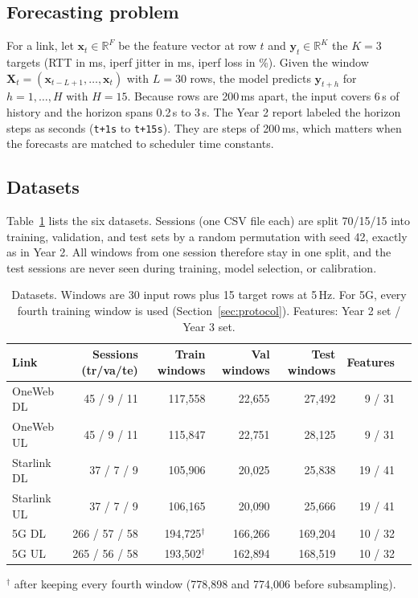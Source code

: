 \subsection{Forecasting problem}
For a link, let $\mathbf{x}_t\in\mathbb{R}^{F}$ be the feature vector at row $t$ and $\mathbf{y}_t\in\mathbb{R}^{K}$ the $K=3$ targets (RTT in ms, iperf jitter in ms, iperf loss in \%). Given the window $\mathbf{X}_t=(\mathbf{x}_{t-L+1},\dots,\mathbf{x}_t)$ with $L=30$ rows, the model predicts $\mathbf{y}_{t+h}$ for $h=1,\dots,H$ with $H=15$. Because rows are 200\,ms apart, the input covers 6\,s of history and the horizon spans 0.2\,s to 3\,s. The Year 2 report labeled the horizon steps as seconds (\texttt{t+1s} to \texttt{t+15s}). They are steps of 200\,ms, which matters when the forecasts are matched to scheduler time constants.

\subsection{Datasets}
Table~\ref{tab:data} lists the six datasets. Sessions (one CSV file each) are split 70/15/15 into training, validation, and test sets by a random permutation with seed 42, exactly as in Year 2. All windows from one session therefore stay in one split, and the test sessions are never seen during training, model selection, or calibration.

\begin{table}[t]
\centering
\caption{Datasets. Windows are 30 input rows plus 15 target rows at 5\,Hz. For 5G, every fourth training window is used (Section~\ref{sec:protocol}). Features: Year 2 set / Year 3 set.}
\label{tab:data}
\small
\begin{tabular}{lrrrrrr}
\toprule
Link & Sessions (tr/va/te) & Train windows & Val windows & Test windows & Features \\
\midrule
OneWeb DL   & 45 / 9 / 11   & 117{,}558 & 22{,}655  & 27{,}492  & 9 / 31 \\
OneWeb UL   & 45 / 9 / 11   & 115{,}847 & 22{,}751  & 28{,}125  & 9 / 31 \\
Starlink DL & 37 / 7 / 9    & 105{,}906 & 20{,}025  & 25{,}838  & 19 / 41 \\
Starlink UL & 37 / 7 / 9    & 106{,}165 & 20{,}090  & 25{,}666  & 19 / 41 \\
5G DL       & 266 / 57 / 58 & 194{,}725$^\dagger$ & 166{,}266 & 169{,}204 & 10 / 32 \\
5G UL       & 265 / 56 / 58 & 193{,}502$^\dagger$ & 162{,}894 & 168{,}519 & 10 / 32 \\
\bottomrule
\end{tabular}

\smallskip
\footnotesize $^\dagger$ after keeping every fourth window (778{,}898 and 774{,}006 before subsampling).
\end{table}
